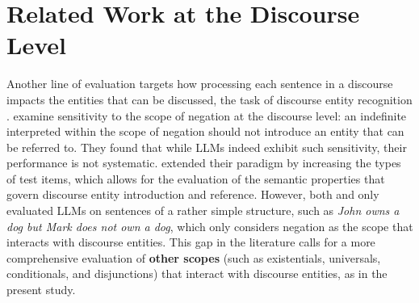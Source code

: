 \section{Related Work at the Discourse Level}

Another line of evaluation targets how processing each sentence in a discourse impacts the entities that can be discussed, the task of   discourse entity recognition \citep{schuster-linzen-2022-sentence, zhu-frank-2024-lieder}. \citeauthor{schuster-linzen-2022-sentence} examine sensitivity to the scope of negation at the discourse level: an indefinite interpreted within the scope of negation should not introduce an entity that can be referred to. They found that while LLMs indeed exhibit such sensitivity, their performance is not systematic. \citet{zhu-frank-2024-lieder} extended their paradigm by increasing the types of test items, which allows for the evaluation of the semantic properties that govern discourse entity introduction and reference. 
However, both \citet{schuster-linzen-2022-sentence} and \citet{zhu-frank-2024-lieder} only evaluated LLMs on sentences of a rather simple structure, such as \textit{John owns a dog but Mark does not own a dog}, which only considers negation as the scope that interacts with discourse entities. This gap in the literature calls for a more comprehensive evaluation of \textbf{other scopes} (such as existentials, universals, conditionals, and disjunctions) that interact with discourse entities, as in the present study.



